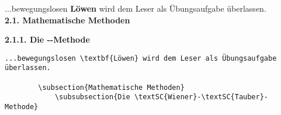 \begin{frame}[fragile]
	\Losung
	\begin{outputbox}
		...bewegungslosen \textbf{Löwen} wird dem Leser als Übungsaufgabe überlassen. \\
		\vspace{12pt}
		{ \Large\textbf{2.1. Mathematische Methoden}}
		
		{ \large\textbf{2.1.1. Die --Methode}}
		
	\end{outputbox}

	\Code
	\begin{lstlisting}[gobble=8]
		...bewegungslosen \textbf{Löwen} wird dem Leser als Übungsaufgabe überlassen.
		
		\subsection{Mathematische Methoden}
			\subsubsection{Die \textSC{Wiener}-\textSC{Tauber}-Methode}
				
		
	\end{lstlisting}
\end{frame}
